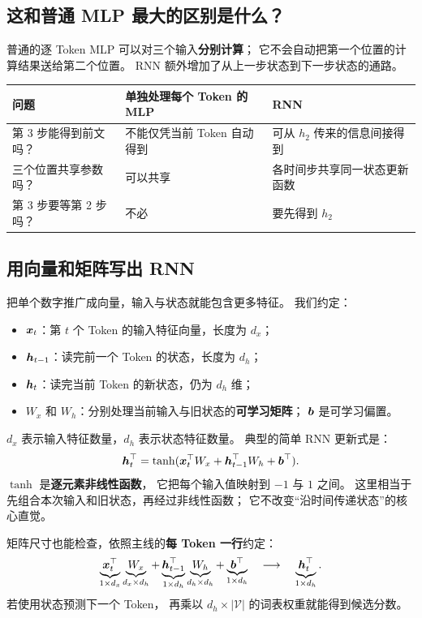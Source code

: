 \subsection{这和普通 MLP 最大的区别是什么？}

普通的逐 Token MLP 可以对三个输入\textbf{分别计算}；
它不会自动把第一个位置的计算结果送给第二个位置。
RNN 额外增加了从上一步状态到下一步状态的通路。

\begin{center}
\small
{}
\begin{tabularx}{\linewidth}{@{}p{33mm}XX@{}}
\toprule
问题 & 单独处理每个 Token 的 MLP & RNN\\
\midrule
第 3 步能得到前文吗？ & 不能仅凭当前 Token 自动得到 & 可从 $h_2$ 传来的信息间接得到\\
三个位置共享参数吗？ & 可以共享 & 各时间步共享同一状态更新函数\\
第 3 步要等第 2 步吗？ & 不必 & 要先得到 $h_2$\\
\bottomrule
\end{tabularx}
\end{center}

\subsection{用向量和矩阵写出 RNN}
\label{concept:time-step}

把单个数字推广成向量，输入与状态就能包含更多特征。
我们约定：
\begin{itemize}
\item $\boldsymbol{x}_t$：第 $t$ 个 Token 的输入特征向量，长度为 $d_x$；
\item $\boldsymbol{h}_{t-1}$：读完前一个 Token 的状态，长度为 $d_h$；
\item $\boldsymbol{h}_t$：读完当前 Token 的新状态，仍为 $d_h$ 维；
\item $W_x$ 和 $W_h$：分别处理当前输入与旧状态的\textbf{可学习矩阵}；
$\boldsymbol{b}$ 是可学习偏置。
\end{itemize}
$d_x$ 表示输入特征数量，$d_h$ 表示状态特征数量。
典型的简单 RNN 更新式是：
\begin{equation}
\boldsymbol{h}_t^\top=\tanh(\boldsymbol{x}_t^\top W_x+
\boldsymbol{h}_{t-1}^\top W_h+\boldsymbol{b}^\top).
\label{eq:rnn-hidden}
\end{equation}
$\tanh$ 是\textbf{逐元素非线性函数}，
它把每个输入值映射到 $-1$ 与 $1$ 之间。
这里相当于先组合本次输入和旧状态，再经过非线性函数；
它不改变“沿时间传递状态”的核心直觉。

矩阵尺寸也能检查，依照主线的\textbf{每 Token 一行}约定：
\[
\underbrace{\boldsymbol{x}_t^\top}_{1\times d_x}
\underbrace{W_x}_{d_x\times d_h}
+
\underbrace{\boldsymbol{h}_{t-1}^\top}_{1\times d_h}
\underbrace{W_h}_{d_h\times d_h}
+\underbrace{\boldsymbol{b}^\top}_{1\times d_h}
\quad\longrightarrow\quad
\underbrace{\boldsymbol{h}_t^\top}_{1\times d_h}.
\]
若使用状态预测下一个 Token，
再乘以 $d_h\times|\mathcal V|$ 的词表权重就能得到候选分数。

